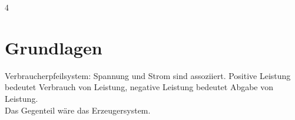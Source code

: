 \documentclass[fs, footer]{latex4ei}
\begin{document}
\vspace{-4mm}
\begin{multicols*}{4}

    \section{Grundlagen}


    Verbraucherpfeilsystem: Spannung und Strom sind assoziiert. Positive Leistung bedeutet Verbrauch von Leistung, negative Leistung bedeutet Abgabe von Leistung.\\
    Das Gegenteil wäre das Erzeugersystem.

    \sectionbox{
}
\end{multicols*}
\end{document}
